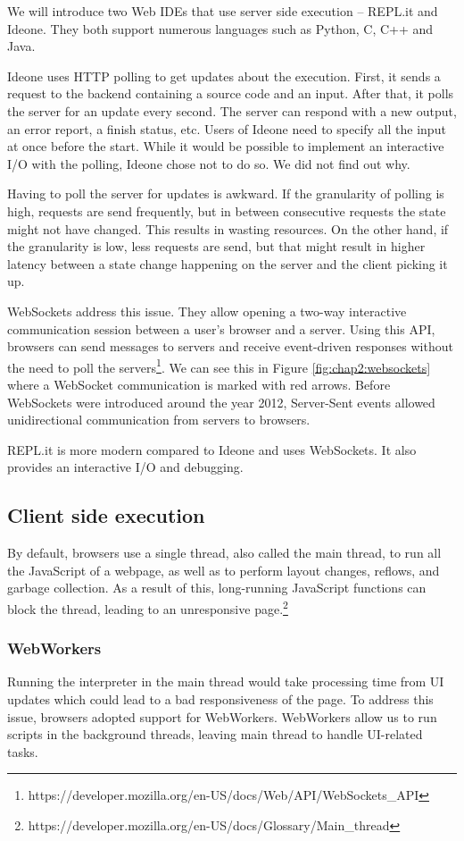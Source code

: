 We will introduce two Web IDEs that use server side execution -- REPL.it and Ideone. They both support numerous languages such
as Python, C, C++ and Java.

Ideone uses HTTP polling to get updates about the execution. First, it sends a request to the backend containing a source code and an input.
After that, it polls the server for an update every second. The server can respond with a new output, an error report, a finish status, etc. Users of Ideone need to
specify all the input at once before the start. While it would be possible to implement an interactive I/O with the polling, Ideone chose not to do so.
We did not find out why.

Having to poll the server for updates is awkward. If the granularity of polling is high, requests are send frequently, but
in between consecutive requests the state might not have changed. This results in wasting resources. On the other hand, if the granularity is low, less
requests are send, but that might result in higher latency between a state change happening on the server and the client picking it up.

WebSockets address this issue. They allow opening a two-way interactive communication session between a user's browser and a server.
Using this API, browsers can send messages to servers and receive event-driven responses without the need to poll
the servers\footnote{https://developer.mozilla.org/en-US/docs/Web/API/WebSockets\_API}.
We can see this in Figure \ref{fig:chap2:websockets} where a WebSocket communication is marked with red arrows.
Before WebSockets were introduced around the year 2012, Server-Sent events allowed unidirectional communication from servers to browsers.

REPL.it is more modern compared to Ideone and uses WebSockets. It also provides an interactive I/O and debugging.

\subsection{Client side execution}
By default, browsers use a single thread, also called the main thread, to run all the JavaScript of a webpage, as well as to perform layout
changes, reflows, and garbage collection. As a result of this, long-running JavaScript functions can block the thread, leading to an unresponsive
page.\footnote{https://developer.mozilla.org/en-US/docs/Glossary/Main\_thread}

\subsubsection{WebWorkers}
Running the interpreter in the main thread would take processing time from UI updates which could lead to a bad responsiveness of the page. To
address this issue, browsers adopted support for WebWorkers. WebWorkers allow us to run scripts in the background threads, leaving main thread
to handle UI-related tasks.

